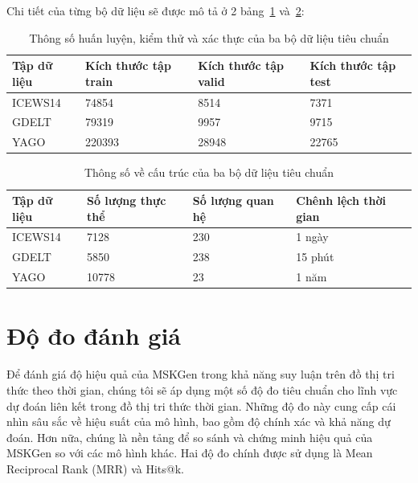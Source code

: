  Chi tiết của từng bộ dữ liệu sẽ được mô tả ở 2 bảng~\ref{tab:table51} và~\ref{tab:table52}:

\begin{table}[H]
\caption{Thông số huấn luyện, kiểm thử và xác thực của ba bộ dữ liệu
 tiêu chuẩn}
\label{tab:table51}
\begin{adjustbox}{width=\textwidth}
\begin{tabular}{|l|l|l|l|}
\hline
Tập dữ  liệu & Kích thước tập train & Kích thước tập valid & Kích thước tập test \\ \hline
ICEWS14      & 74854                & 8514                 & 7371                \\ \hline
GDELT        & 79319                & 9957                 & 9715                \\ \hline
YAGO         & 220393               & 28948                & 22765               \\ \hline
\end{tabular}
\end{adjustbox} 
\end{table}

\begin{table}[H]
\caption{Thông số về cấu trúc của ba bộ dữ liệu tiêu chuẩn}
\label{tab:table52}
\begin{adjustbox}{width=\textwidth}
\begin{tabular}{|l|l|l|l|}
\hline
Tập dữ  liệu & Số lượng thực thể & Số lượng quan hệ & Chênh lệch thời gian \\ \hline
ICEWS14      & 7128              & 230              & 1 ngày               \\ \hline
GDELT        & 5850              & 238              & 15 phút              \\ \hline
YAGO         & 10778             & 23               & 1 năm                \\ \hline
\end{tabular}
\end{adjustbox} 
\end{table}

\section{Độ đo đánh giá}
Để đánh giá độ hiệu quả của MSKGen trong khả năng suy luận trên đồ thị tri thức theo thời gian, chúng tôi sẽ áp dụng một số độ đo tiêu chuẩn cho lĩnh vực dự đoán liên kết trong đồ thị tri thức thời gian. Những độ đo này cung cấp cái nhìn sâu sắc về hiệu suất của mô hình, bao gồm độ chính xác và khả năng dự đoán. Hơn nữa, chúng là nền tảng để so sánh và chứng minh hiệu quả của MSKGen so với các mô hình khác. Hai độ đo chính được sử dụng là Mean Reciprocal Rank (MRR) và Hits@k.

